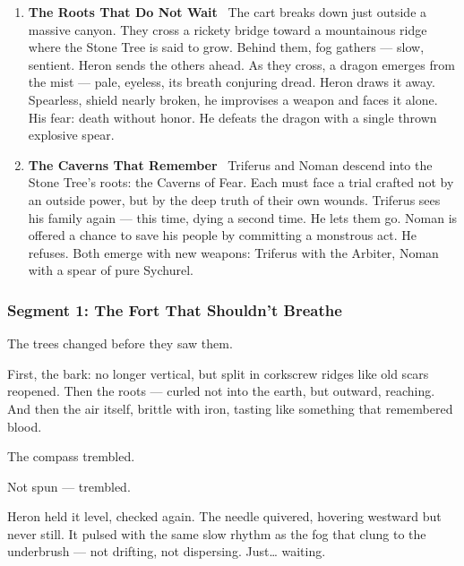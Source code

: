 \documentclass[9pt]{article}
\begin{document}
\begin{center}
\begin{enumerate}
\vspace{.3in}

\item \textbf{The Roots That Do Not Wait} \
The cart breaks down just outside a massive canyon. They cross a rickety bridge toward a mountainous ridge where the Stone Tree is said to grow. Behind them, fog gathers — slow, sentient. Heron sends the others ahead. As they cross, a dragon emerges from the mist — pale, eyeless, its breath conjuring dread. Heron draws it away. Spearless, shield nearly broken, he improvises a weapon and faces it alone. His fear: death without honor. He defeats the dragon with a single thrown explosive spear.

\vspace{.3in}

\item \textbf{The Caverns That Remember} \
Triferus and Noman descend into the Stone Tree’s roots: the Caverns of Fear. Each must face a trial crafted not by an outside power, but by the deep truth of their own wounds. Triferus sees his family again — this time, dying a second time. He lets them go. Noman is offered a chance to save his people by committing a monstrous act. He refuses. Both emerge with new weapons: Triferus with the Arbiter, Noman with a spear of pure Sychurel.

\vspace{.3in}

\end{enumerate}
\end{center}

\newpage

\subsubsection*{Segment 1: The Fort That Shouldn’t Breathe}

The trees changed before they saw them.

First, the bark: no longer vertical, but split in corkscrew ridges like old scars reopened. Then the roots — curled not into the earth, but outward, reaching. And then the air itself, brittle with iron, tasting like something that remembered blood.

The compass trembled.

Not spun — trembled.

Heron held it level, checked again. The needle quivered, hovering westward but never still. It pulsed with the same slow rhythm as the fog that clung to the underbrush — not drifting, not dispersing. Just… waiting.
\end{document}
